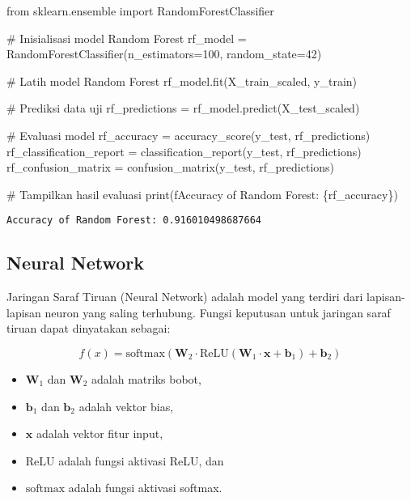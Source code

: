 \documentclass[
  letterpaper,
]{krantz}
\makeatletter
\newenvironment{Shaded}{\begin{snugshade}}{\end{snugshade}}
\newcommand{\BuiltInTok}[1]{\textcolor[rgb]{0.00,0.23,0.31}{#1}}
\newcommand{\CommentTok}[1]{\textcolor[rgb]{0.37,0.37,0.37}{#1}}
\newcommand{\DecValTok}[1]{\textcolor[rgb]{0.68,0.00,0.00}{#1}}
\newcommand{\ImportTok}[1]{\textcolor[rgb]{0.00,0.46,0.62}{#1}}
\newcommand{\NormalTok}[1]{\textcolor[rgb]{0.00,0.23,0.31}{#1}}
\newcommand{\OperatorTok}[1]{\textcolor[rgb]{0.37,0.37,0.37}{#1}}
\newcommand{\SpecialCharTok}[1]{\textcolor[rgb]{0.37,0.37,0.37}{#1}}
\newcommand{\SpecialStringTok}[1]{\textcolor[rgb]{0.13,0.47,0.30}{#1}}
\providecommand{\tightlist}{%
  \setlength{\itemsep}{0pt}\setlength{\parskip}{0pt}}\usepackage{longtable,booktabs,array}
\newenvironment{kframe}{%
\medskip{}
\setlength{\fboxsep}{.8em}
 \def\at@end@of@kframe{}%
 \ifinner\ifhmode%
  \def\at@end@of@kframe{\end{minipage}}%
  \begin{minipage}{\columnwidth}%
 \fi\fi%
 \def\FrameCommand##1{\hskip\@totalleftmargin \hskip-\fboxsep
 \colorbox{shadecolor}{##1}\hskip-\fboxsep
     \hskip-\linewidth \hskip-\@totalleftmargin \hskip\columnwidth}%
 \MakeFramed {\advance\hsize-\width
   \@totalleftmargin\z@ \linewidth\hsize
   \@setminipage}}%
 {\par\unskip\endMakeFramed%
 \at@end@of@kframe}
\renewenvironment{Shaded}{\begin{kframe}}{\end{kframe}}
\makeatother
\begin{document}
\begin{Shaded}
\begin{Highlighting}[]
\ImportTok{from}\NormalTok{ sklearn.ensemble }\ImportTok{import}\NormalTok{ RandomForestClassifier}

\CommentTok{\# Inisialisasi model Random Forest}
\NormalTok{rf\_model }\OperatorTok{=}\NormalTok{ RandomForestClassifier(n\_estimators}\OperatorTok{=}\DecValTok{100}\NormalTok{, random\_state}\OperatorTok{=}\DecValTok{42}\NormalTok{)}

\CommentTok{\# Latih model Random Forest}
\NormalTok{rf\_model.fit(X\_train\_scaled, y\_train)}

\CommentTok{\# Prediksi data uji}
\NormalTok{rf\_predictions }\OperatorTok{=}\NormalTok{ rf\_model.predict(X\_test\_scaled)}

\CommentTok{\# Evaluasi model}
\NormalTok{rf\_accuracy }\OperatorTok{=}\NormalTok{ accuracy\_score(y\_test, rf\_predictions)}
\NormalTok{rf\_classification\_report }\OperatorTok{=}\NormalTok{ classification\_report(y\_test, rf\_predictions)}
\NormalTok{rf\_confusion\_matrix }\OperatorTok{=}\NormalTok{ confusion\_matrix(y\_test, rf\_predictions)}

\CommentTok{\# Tampilkan hasil evaluasi}
\BuiltInTok{print}\NormalTok{(}\SpecialStringTok{f\textquotesingle{}Accuracy of Random Forest: }\SpecialCharTok{\{}\NormalTok{rf\_accuracy}\SpecialCharTok{\}}\SpecialStringTok{\textquotesingle{}}\NormalTok{)}
\end{Highlighting}
\end{Shaded}

\begin{verbatim}
Accuracy of Random Forest: 0.916010498687664
\end{verbatim}

\hypertarget{neural-network}{%
\subsection{Neural Network}\label{neural-network}}

Jaringan Saraf Tiruan (Neural Network) adalah model yang terdiri dari
lapisan-lapisan neuron yang saling terhubung. Fungsi keputusan untuk
jaringan saraf tiruan dapat dinyatakan sebagai:

\[
f(x) = \text{softmax}(\mathbf{W}_2 \cdot \text{ReLU}(\mathbf{W}_1 \cdot \mathbf{x} + \mathbf{b}_1) + \mathbf{b}_2)
\]

\begin{itemize}
\tightlist
\item
  \(\mathbf{W}_1\) dan \(\mathbf{W}_2\) adalah matriks bobot,
\item
  \(\mathbf{b}_1\) dan \(\mathbf{b}_2\) adalah vektor bias,
\item
  \(\mathbf{x}\) adalah vektor fitur input,
\item
  \(\text{ReLU}\) adalah fungsi aktivasi ReLU, dan
\item
  \(\text{softmax}\) adalah fungsi aktivasi softmax.
\end{itemize}
\end{document}
